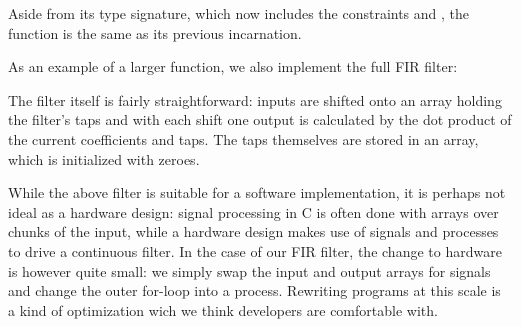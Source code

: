\documentclass[../paper.tex]{subfiles}
\begin{document}
\noindent Aside from its type signature, which now includes the constraints  and , the function is the same as its previous incarnation.

As an example of a larger function, we also implement the full FIR filter:


\noindent The filter itself is fairly straightforward: inputs are shifted onto an array holding the filter's taps and with each shift one output is calculated by the dot product of the current coefficients and taps. The taps themselves are stored in an array, which is initialized with zeroes.

While the above filter is suitable for a software implementation, it is perhaps not ideal as a hardware design: signal processing in C is often done with arrays over chunks of the input, while a hardware design makes use of signals and processes to drive a continuous filter. In the case of our FIR filter, the change to hardware is however quite small: we simply swap the input and output arrays for signals and change the outer for-loop into a process. Rewriting programs at this scale is a kind of optimization wich we think developers are comfortable with. 




\end{document}
